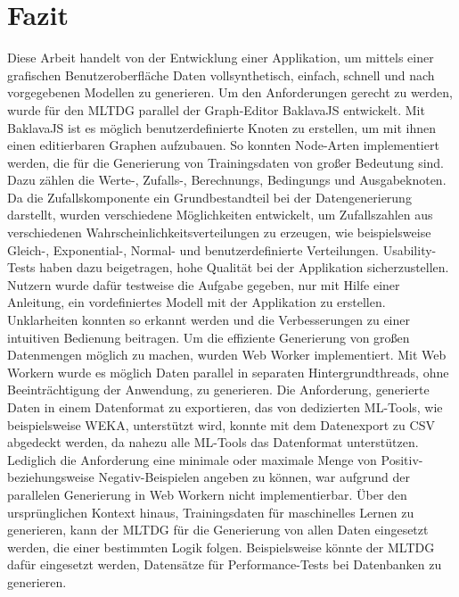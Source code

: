 
\chapter{Fazit}

Diese Arbeit handelt von der Entwicklung einer Applikation, um mittels einer grafischen Benutzeroberfläche Daten vollsynthetisch, einfach, schnell und nach vorgegebenen Modellen zu generieren. Um den Anforderungen gerecht zu werden, wurde für den \ac{MLTDG} parallel der Graph-Editor BaklavaJS entwickelt. Mit BaklavaJS ist es möglich benutzerdefinierte Knoten zu erstellen, um mit ihnen einen editierbaren Graphen aufzubauen. So konnten Node-Arten implementiert werden, die für die Generierung von Trainingsdaten von großer Bedeutung sind. Dazu zählen die Werte-, Zufalls-, Berechnungs, Bedingungs und Ausgabeknoten. Da die Zufallskomponente ein Grundbestandteil bei der Datengenerierung darstellt, wurden verschiedene Möglichkeiten entwickelt, um Zufallszahlen aus verschiedenen Wahrscheinlichkeitsverteilungen zu erzeugen, wie beispielsweise Gleich-, Exponential-, Normal- und benutzerdefinierte Verteilungen. Usability-Tests haben dazu beigetragen, hohe Qualität bei der Applikation sicherzustellen. Nutzern wurde dafür testweise die Aufgabe gegeben, nur mit Hilfe einer Anleitung, ein vordefiniertes Modell mit der Applikation zu erstellen. Unklarheiten konnten so erkannt werden und die Verbesserungen zu einer intuitiven Bedienung beitragen. Um die effiziente Generierung von großen Datenmengen möglich zu machen, wurden Web Worker implementiert. Mit Web Workern wurde es möglich Daten parallel in separaten Hintergrundthreads, ohne Beeinträchtigung der Anwendung, zu generieren. Die Anforderung, generierte Daten in einem Datenformat zu exportieren, das von dedizierten \ac{ML}-Tools, wie beispielsweise WEKA, unterstützt wird, konnte mit dem Datenexport zu \ac{CSV} abgedeckt werden, da nahezu alle \ac{ML}-Tools das Datenformat unterstützen. Lediglich die Anforderung eine minimale oder maximale Menge von Positiv- beziehungsweise Negativ-Beispielen angeben zu können, war aufgrund der parallelen Generierung in Web Workern nicht implementierbar. Über den ursprünglichen Kontext hinaus, Trainingsdaten für maschinelles Lernen zu generieren, kann der \ac{MLTDG} für die Generierung von allen Daten eingesetzt werden, die einer bestimmten Logik folgen. Beispielsweise könnte der \ac{MLTDG} dafür eingesetzt werden, Datensätze für Performance-Tests bei Datenbanken zu generieren.